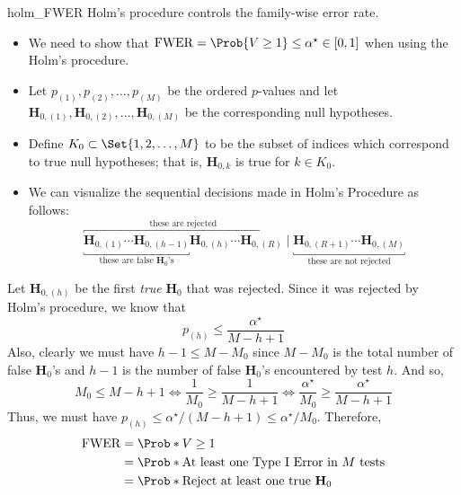 \begin{Theorem}{}{holm_FWER}
    Holm's procedure controls the family-wise error rate.
\end{Theorem}
\begin{Proof}{ \dagger}{}
    \begin{itemize}
        \item We need to show that $ \FWER=\Prob{V\ge 1}\le \alpha^\star\in[0,1] $ when using the Holm's procedure.
        \item Let $ p_{(1)},p_{(2)},\ldots,p_{(M)} $ be the ordered $ p $-values and let
              $ \mathbf{H}_{0,(1)},\mathbf{H}_{0,(2)},\ldots,\mathbf{H}_{0,(M)} $ be the corresponding null hypotheses.
        \item Define $ K_0\subset \Set{1,2,\ldots,M} $ to be the subset of indices which correspond
              to true null hypotheses; that is, $ \mathbf{H}_{0,k} $ is true for $ k\in K_0 $.
        \item We can visualize the sequential decisions made in Holm's Procedure as follows:
              \[ \overbracket{\underbracket{\mathbf{H}_{0,(1)}\cdots\mathbf{H}_{0,(h-1)}}_{\text{these are false $\mathbf{H}_0$'s}}\mathbf{H}_{0,(h)}\cdots \mathbf{H}_{0,(R)}}^{\text{these are rejected}}\mid \underbracket{\mathbf{H}_{0,(R+1)}\cdots\mathbf{H}_{0,(M)}}_{\text{these are not rejected}} \]
    \end{itemize}
    Let $ \mathbf{H}_{0,(h)} $ be the first \emph{true} $ \mathbf{H}_0 $ that was rejected. Since it was rejected by Holm's procedure, we know that
    \[ p_{(h)}\le \frac{\alpha^\star}{M-h+1} \]
    Also, clearly we must have $ h-1\le M-M_0 $ since $ M-M_0 $ is the total number of false $ \mathbf{H}_0 $'s and $ h-1 $ is the number of false
    $ \mathbf{H}_0 $'s encountered by test $ h $. And so,
    \[
        M_0\le M-h+1
        \iff \frac{1}{M_0} \ge \frac{1}{M-h+1}
        \iff \frac{\alpha^\star}{M_0} \ge \frac{\alpha^\star}{M-h+1}
    \]
    Thus, we must have $ p_{(h)}\le \alpha^\star/(M-h+1)\le \alpha^\star/M_0 $. Therefore,
    \begin{align*}
        \FWER
         & =\Prob*{V\ge 1}                                                                                                                    \\
         & =\Prob*{\text{At least one Type I Error in $M$ tests}}                                                                             \\
         & =\Prob*{\text{Reject at least one true $\mathbf{H}_0$}}                                                                            \\

\end{align*}
\end{Proof}
